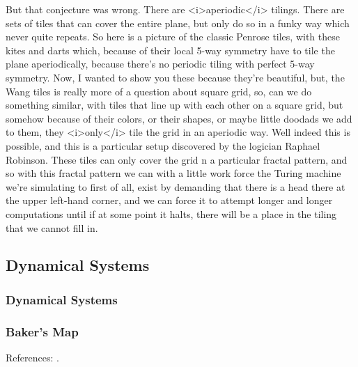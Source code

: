 \documentclass[]{article}
\begin{document}
But that conjecture was wrong.
There are <i>aperiodic</i> tilings.
There are sets of tiles that can cover
the entire plane,
but only do so
in a funky way
which never quite repeats.
So here is a picture
of the classic Penrose tiles,
with these kites and darts
which, because of their local
5-way symmetry
have to tile the plane aperiodically,
because there's no periodic tiling
with perfect 5-way symmetry.
Now, I wanted to show you these
because they're beautiful,
but,
the Wang tiles is really more of
a question about square grid,
so, can we do something similar,
with tiles that line up with each other
on a square grid,
but somehow because of their colors,
or their shapes,
or maybe little doodads we add to them,
they <i>only</i> tile the grid
in an aperiodic way.
Well indeed this is possible,
and this is a particular setup
discovered by the logician
Raphael Robinson.
These tiles can only cover the grid
n a particular fractal pattern,
and so with this fractal pattern
we can with a little work
force
the Turing machine we're simulating
to first of all, exist
by demanding that there is a head
there at the upper left-hand corner,
and we can force it to attempt
longer and longer computations
until if at some point it halts,
there will be a place in the tiling
that we cannot fill in.

\subsection{Dynamical Systems} 

\subsubsection{Dynamical Systems} 

\subsubsection{Baker's Map}

References: \cite[Chapter 7]{moore2011nature}.



\printglossaries

 

\raggedright
{}

\end{document}
